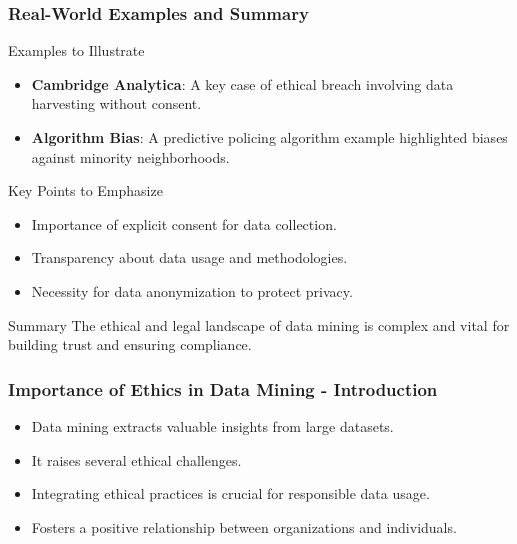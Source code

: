 \documentclass{beamer}
\begin{document}
\begin{frame}[fragile]
    \frametitle{Real-World Examples and Summary}
    \begin{block}{Examples to Illustrate}
        \begin{itemize}
            \item \textbf{Cambridge Analytica}: A key case of ethical breach involving data harvesting without consent.
            \item \textbf{Algorithm Bias}: A predictive policing algorithm example highlighted biases against minority neighborhoods.
        \end{itemize}
    \end{block}
    
    \begin{block}{Key Points to Emphasize}
        \begin{itemize}
            \item Importance of explicit consent for data collection.
            \item Transparency about data usage and methodologies.
            \item Necessity for data anonymization to protect privacy.
        \end{itemize}
    \end{block}

    \begin{block}{Summary}
        The ethical and legal landscape of data mining is complex and vital for building trust and ensuring compliance.
    \end{block}
\end{frame}

\begin{frame}[fragile]
    \frametitle{Importance of Ethics in Data Mining - Introduction}
    \begin{itemize}
        \item Data mining extracts valuable insights from large datasets.
        \item It raises several ethical challenges.
        \item Integrating ethical practices is crucial for responsible data usage.
        \item Fosters a positive relationship between organizations and individuals.
    \end{itemize}
\end{frame}
\end{document}
